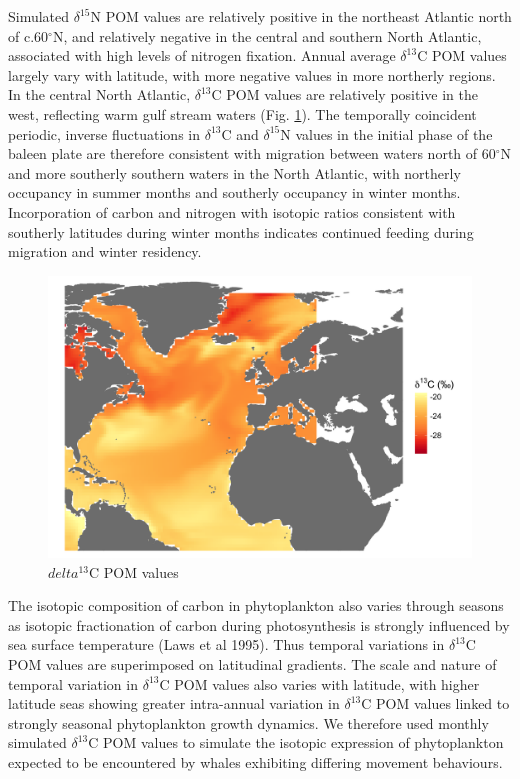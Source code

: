 \documentclass[a4paper,12pt]{article}
\begin{document}
Simulated $\delta^{15}$N POM values are relatively positive in the northeast Atlantic north of c.60$^{\circ}$N, and relatively negative in the central and southern North Atlantic, associated with high levels of nitrogen fixation. 
Annual average $\delta^{13}$C POM values largely vary with latitude, with more negative values in more northerly regions. 
In the central North Atlantic, $\delta^{13}$C POM values are relatively positive in the west, reflecting warm gulf stream waters (Fig. \ref{figs3}). 
The temporally coincident periodic, inverse fluctuations in $\delta^{13}$C and $\delta^{15}$N values in the initial phase of the baleen plate are therefore consistent with migration between waters north of 60$^{\circ}$N and more southerly southern waters in the North Atlantic, with northerly occupancy in summer months and southerly occupancy in winter months. 
Incorporation of carbon and nitrogen with isotopic ratios consistent with southerly latitudes during winter months indicates continued feeding during migration and winter residency.
 
\begin{figure}[!htbp]
  \centering
  \includegraphics[width = \linewidth]{figures/Figure-S3-plankton-d13C-map.png}
  \caption{$delta^{13}$C POM values} %
  \label{figs3} 
\end{figure}

The isotopic composition of carbon in phytoplankton also varies through seasons as isotopic fractionation of carbon during photosynthesis is strongly influenced by sea surface temperature (Laws et al 1995). 
Thus temporal variations in $\delta^{13}$C POM values are superimposed on latitudinal gradients. 
The scale and nature of temporal variation in $\delta^{13}$C POM values also varies with latitude, with higher latitude seas showing greater intra-annual variation in $\delta^{13}$C POM values linked to strongly seasonal phytoplankton growth dynamics. 
We therefore used monthly simulated $\delta^{13}$C POM values to simulate the isotopic expression of phytoplankton expected to be encountered by whales exhibiting differing movement behaviours.
 
\end{document}
